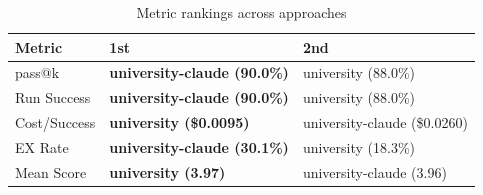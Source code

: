 \begin{table}[htbp]
\centering
\caption{Metric rankings across approaches}
\label{tab:rankings}
\begin{tabular}{lll}
\toprule
Metric & 1st & 2nd \\
\midrule
pass@k & \textbf{university-claude (90.0\%)} & university (88.0\%) \\
Run Success & \textbf{university-claude (90.0\%)} & university (88.0\%) \\
Cost/Success & \textbf{university (\$0.0095)} & university-claude (\$0.0260) \\
EX Rate & \textbf{university-claude (30.1\%)} & university (18.3\%) \\
Mean Score & \textbf{university (3.97)} & university-claude (3.96) \\
\bottomrule
\end{tabular}
\end{table}
